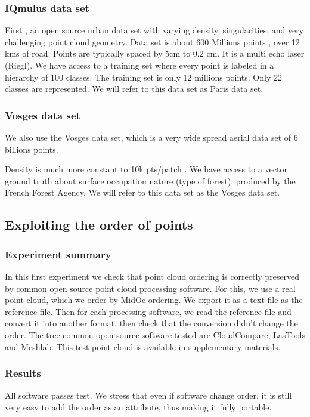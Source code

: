 		
		\subsubsection{IQmulus data set}
			First \cite{IQmulus2014}, an open source urban data set with varying density, singularities, and very challenging point cloud geometry.
			Data set is about 600 Millions points , over 12 kms of road. Points are typically spaced by 5cm to 0.2 cm. It is a multi echo laser (Riegl).
			We have access to a training set where every point is labeled in a hierarchy of 100 classes. The training set is only 12 millions points. Only 22 classes are represented.
			We will refer to this data set as Paris data set.
			
		\subsubsection{Vosges data set}
			We also use the Vosges data set, which is a very wide spread aerial data set of 6 billions points. 
			
			Density is much more constant to 10k pts/patch .
			We have access to a vector ground truth about surface occupation nature (type of forest), produced by the French Forest Agency.
			We will refer to this data set as the Vosges data set.
		
	\subsection{Exploiting the order of points}
		\subsubsection{Experiment summary}
			In this first experiment we check that point cloud ordering is correctly preserved by common open source point cloud processing software.
			For this, we use a real point cloud, which we order by MidOc ordering. 
			We export it as a text file as the reference file.
			Then for each processing software, we read the reference file and convert it into another format, then check that the conversion didn't change the order. 
			The tree common open source software tested are CloudCompare, LasTools and Meshlab.
			This test point cloud is available in supplementary materials.
		\subsubsection{Results}  
			All software passes test.
			We stress that even if software change order, it is still very easy to add the order as an attribute, thus making it fully portable.
			
